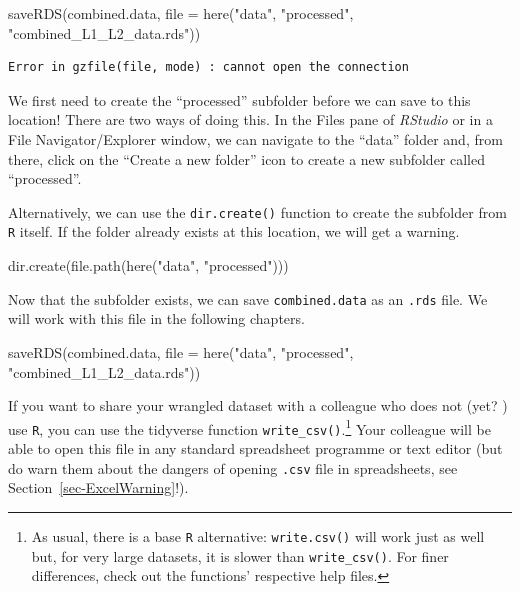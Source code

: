 \documentclass[
  letterpaper,
  DIV=11,
  numbers=noendperiod]{scrreprt}
\newenvironment{Shaded}{\begin{snugshade}}{\end{snugshade}}
\newcommand{\AttributeTok}[1]{\textcolor[rgb]{0.40,0.45,0.13}{#1}}
\newcommand{\FunctionTok}[1]{\textcolor[rgb]{0.28,0.35,0.67}{#1}}
\newcommand{\NormalTok}[1]{\textcolor[rgb]{0.00,0.23,0.31}{#1}}
\newcommand{\StringTok}[1]{\textcolor[rgb]{0.13,0.47,0.30}{#1}}
\begin{document}
\begin{Shaded}
\begin{Highlighting}[]
\FunctionTok{saveRDS}\NormalTok{(combined.data, }\AttributeTok{file =} \FunctionTok{here}\NormalTok{(}\StringTok{"data"}\NormalTok{, }\StringTok{"processed"}\NormalTok{, }\StringTok{"combined\_L1\_L2\_data.rds"}\NormalTok{))}
\end{Highlighting}
\end{Shaded}

\begin{verbatim}
Error in gzfile(file, mode) : cannot open the connection
\end{verbatim}

We first need to create the ``processed'' subfolder before we can save
to this location! There are two ways of doing this. In the Files pane of
\emph{RStudio} or in a File Navigator/Explorer window, we can navigate
to the ``data'' folder and, from there, click on the ``Create a new
folder'' icon to create a new subfolder called ``processed''.

Alternatively, we can use the \texttt{dir.create()} function to create
the subfolder from \texttt{R} itself. If the folder already exists at
this location, we will get a warning.

\begin{Shaded}
\begin{Highlighting}[]
\FunctionTok{dir.create}\NormalTok{(}\FunctionTok{file.path}\NormalTok{(}\FunctionTok{here}\NormalTok{(}\StringTok{"data"}\NormalTok{, }\StringTok{"processed"}\NormalTok{)))}
\end{Highlighting}
\end{Shaded}

Now that the subfolder exists, we can save \texttt{combined.data} as an
\texttt{.rds} file. We will work with this file in the following
chapters.

\begin{Shaded}
\begin{Highlighting}[]
\FunctionTok{saveRDS}\NormalTok{(combined.data, }\AttributeTok{file =} \FunctionTok{here}\NormalTok{(}\StringTok{"data"}\NormalTok{, }\StringTok{"processed"}\NormalTok{, }\StringTok{"combined\_L1\_L2\_data.rds"}\NormalTok{))}
\end{Highlighting}
\end{Shaded}

If you want to share your wrangled dataset with a colleague who does not
(yet? ) use \texttt{R}, you can use the tidyverse function
\texttt{write\_csv()}.\footnote{As usual, there is a base \texttt{R}
  alternative: \texttt{write.csv()} will work just as well but, for very
  large datasets, it is slower than \texttt{write\_csv()}. For finer
  differences, check out the functions' respective help files.} Your
colleague will be able to open this file in any standard spreadsheet
programme or text editor (but do warn them about the dangers of opening
\texttt{.csv} file in spreadsheets, see
Section~\ref{sec-ExcelWarning}!).
\end{document}
